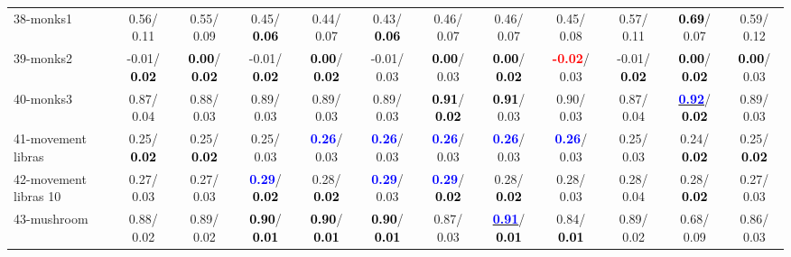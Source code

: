\begin{table}[h]
\begin{center}
{\begin{tabular}{lc|c|c|c|c|c|c|c|c|c|c}
38-monks1 &   0.56/  0.11 &   0.55/  0.09 &   0.45/\textcolor{black}{\textbf{  0.06}} &   0.44/  0.07 &   0.43/\textcolor{black}{\textbf{  0.06}} &   0.46/  0.07 &   0.46/  0.07 &   0.45/  0.08 &   0.57/  0.11 & \textcolor{black}{\textbf{  0.69}}/  0.07 &   0.59/  0.12 \\
39-monks2 &  -0.01/\textcolor{black}{\textbf{  0.02}} & \textcolor{black}{\textbf{  0.00}}/\textcolor{black}{\textbf{  0.02}} &  -0.01/\textcolor{black}{\textbf{  0.02}} & \textcolor{black}{\textbf{  0.00}}/\textcolor{black}{\textbf{  0.02}} &  -0.01/  0.03 & \textcolor{black}{\textbf{  0.00}}/  0.03 & \textcolor{black}{\textbf{  0.00}}/\textcolor{black}{\textbf{  0.02}} & \textcolor{red}{\textbf{ -0.02}}/  0.03 &  -0.01/\textcolor{black}{\textbf{  0.02}} & \textcolor{black}{\textbf{  0.00}}/\textcolor{black}{\textbf{  0.02}} & \textcolor{black}{\textbf{  0.00}}/  0.03 \\ \hline
40-monks3 &   0.87/  0.04 &   0.88/  0.03 &   0.89/  0.03 &   0.89/  0.03 &   0.89/  0.03 & \textcolor{black}{\textbf{  0.91}}/\textcolor{black}{\textbf{  0.02}} & \textcolor{black}{\textbf{  0.91}}/  0.03 &   0.90/  0.03 &   0.87/  0.04 & \underline{\textcolor{blue}{\textbf{  0.92}}}/\textcolor{black}{\textbf{  0.02}} &   0.89/  0.03 \\
41-movement libras &   0.25/\textcolor{black}{\textbf{  0.02}} &   0.25/\textcolor{black}{\textbf{  0.02}} &   0.25/  0.03 & \textcolor{blue}{\textbf{  0.26}}/  0.03 & \textcolor{blue}{\textbf{  0.26}}/  0.03 & \textcolor{blue}{\textbf{  0.26}}/  0.03 & \textcolor{blue}{\textbf{  0.26}}/  0.03 & \textcolor{blue}{\textbf{  0.26}}/  0.03 &   0.25/  0.03 &   0.24/\textcolor{black}{\textbf{  0.02}} &   0.25/\textcolor{black}{\textbf{  0.02}} \\
42-movement libras 10 &   0.27/  0.03 &   0.27/  0.03 & \textcolor{blue}{\textbf{  0.29}}/\textcolor{black}{\textbf{  0.02}} &   0.28/\textcolor{black}{\textbf{  0.02}} & \textcolor{blue}{\textbf{  0.29}}/  0.03 & \textcolor{blue}{\textbf{  0.29}}/\textcolor{black}{\textbf{  0.02}} &   0.28/\textcolor{black}{\textbf{  0.02}} &   0.28/  0.03 &   0.28/  0.04 &   0.28/\textcolor{black}{\textbf{  0.02}} &   0.27/  0.03 \\
43-mushroom &   0.88/  0.02 &   0.89/  0.02 & \textcolor{black}{\textbf{  0.90}}/\textcolor{black}{\textbf{  0.01}} & \textcolor{black}{\textbf{  0.90}}/\textcolor{black}{\textbf{  0.01}} & \textcolor{black}{\textbf{  0.90}}/\textcolor{black}{\textbf{  0.01}} &   0.87/  0.03 & \underline{\textcolor{blue}{\textbf{  0.91}}}/\textcolor{black}{\textbf{  0.01}} &   0.84/\textcolor{black}{\textbf{  0.01}} &   0.89/  0.02 &   0.68/  0.09 &   0.86/  0.03 \\

\end{tabular}}
\end{center}
\end{table}
